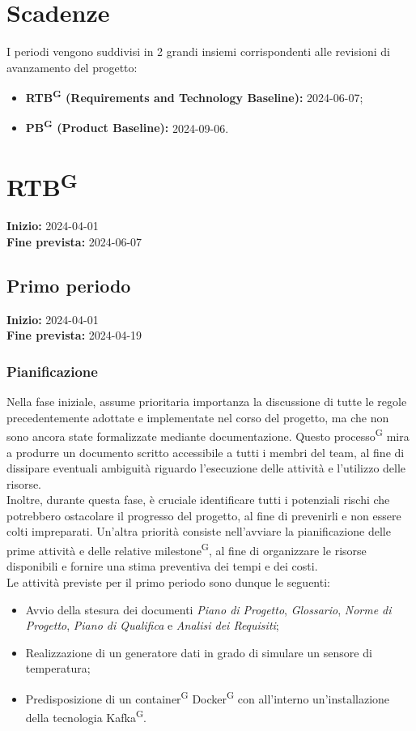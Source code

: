 \documentclass[8pt]{article}
\newcommand{\glossterm}[1]{#1\textsuperscript{G}} %
\begin{document}
\newpage
\section{Scadenze}
I periodi vengono suddivisi in 2 grandi insiemi corrispondenti alle revisioni di avanzamento del progetto:
\begin{itemize}
\setlength\itemsep{0em}
\item \textbf{\glossterm{RTB} (Requirements and Technology Baseline):} 2024-06-07;
\item \textbf{\glossterm{PB} (Product Baseline):} 2024-09-06.
\end{itemize}

\section{\glossterm{RTB}}
\textbf{Inizio:} 2024-04-01\\
\textbf{Fine prevista:} 2024-06-07
\subsection{Primo periodo} \label{sec:1_rtb}
\textbf{Inizio:} 2024-04-01\\
\textbf{Fine prevista:} 2024-04-19
\subsubsection{Pianificazione}
Nella fase iniziale, assume prioritaria importanza la discussione di tutte le regole precedentemente adottate e implementate nel corso del progetto, ma che non sono ancora state formalizzate mediante documentazione. Questo \glossterm{processo} mira a produrre un documento scritto accessibile a tutti i membri del team, al fine di dissipare eventuali ambiguità riguardo l'esecuzione delle attività e l'utilizzo delle risorse.
\\
Inoltre, durante questa fase, è cruciale identificare tutti i potenziali rischi che potrebbero ostacolare il progresso del progetto, al fine di prevenirli e non essere colti impreparati. Un'altra priorità consiste nell'avviare la pianificazione delle prime attività e delle relative \glossterm{milestone}, al fine di organizzare le risorse disponibili e fornire una stima preventiva dei tempi e dei costi. \\
Le attività previste per il primo periodo sono dunque le seguenti:
\begin{itemize}
\setlength{\itemsep}{0em}
    \item Avvio della stesura dei documenti \textit{Piano di Progetto}, \textit{Glossario}, \textit{Norme di Progetto}, \textit{Piano di Qualifica} e \textit{Analisi dei Requisiti};
    \item Realizzazione di un generatore dati in grado di simulare un sensore di temperatura;
    \item Predisposizione di un \glossterm{container} \glossterm{Docker} con all'interno un'installazione della tecnologia \glossterm{Kafka}.
\end{itemize}
\end{document}
